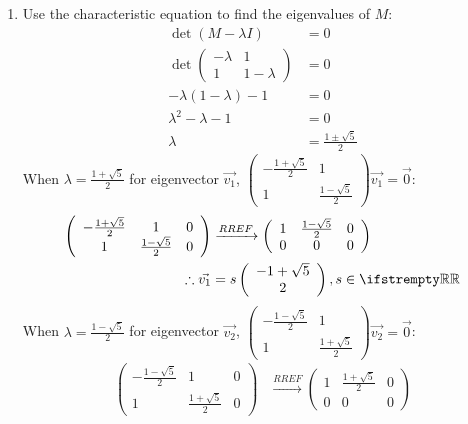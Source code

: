 \documentclass[12pt, a4paper]{article}
\begin{document}
\begin{enumerate}[Q\arabic*.]
\begin{enumerate}[(\alph*)]
    \item Use the characteristic equation to find the eigenvalues of $M$:
      \begin{align*}
        \det(M - \lambda I) &= 0\\
        \det\left(\begin{array}{cc} -\lambda & 1\\ 1 & 1-\lambda\end{array}\right) &= 0\\
        -\lambda(1-\lambda) - 1 &= 0\\
        \lambda^2 -\lambda - 1 &= 0\\
        \lambda &= \frac{1 \pm \sqrt{5}}{2}
      \end{align*}
      When $\lambda = \frac{1+\sqrt{5}}{2}$ for eigenvector $\vec{v_1}$, $\left(\begin{array}{cc} -\frac{1+\sqrt{5}}{2} & 1\\ 1 & \frac{1-\sqrt{5}}{2}\end{array}\right) \vec{v_1}= \vec{0}$:
      \begin{align*}
        \left(\begin{array}{ccc} -\frac{1+\sqrt{5}}{2} & 1 & 0\\ 1 & \frac{1-\sqrt{5}}{2} & 0 \end{array}\right) &\xrightarrow{RREF} \left(\begin{array}{ccc} 1 & \frac{1-\sqrt{5}}{2} & 0\\ 0 & 0 & 0 \end{array}\right)\\
        \therefore \vec{v_1} &= s\left(\begin{array}{c} -1+\sqrt{5}\\ 2 \end{array}\right), s\in\RR
      \end{align*}
      When $\lambda = \frac{1-\sqrt{5}}{2}$ for eigenvector $\vec{v_2}$, $\left(\begin{array}{cc} -\frac{1-\sqrt{5}}{2} & 1\\ 1 & \frac{1+\sqrt{5}}{2}\end{array}\right) \vec{v_2}= \vec{0}$:
      \begin{align*}
        \left(\begin{array}{ccc} -\frac{1-\sqrt{5}}{2} & 1 & 0\\ 1 & \frac{1+\sqrt{5}}{2} & 0 \end{array}\right) &\xrightarrow{RREF} \left(\begin{array}{ccc} 1 & \frac{1+\sqrt{5}}{2} & 0\\ 0 & 0 & 0 \end{array}\right)\\

\end{align*}
\end{enumerate}
\end{enumerate}
\end{document}
